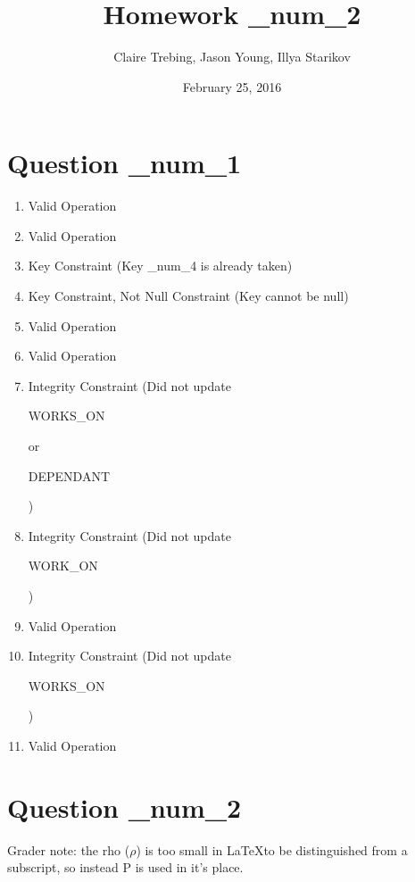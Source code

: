 \documentclass{article}
\title{Homework \_num_2}
\author{Claire Trebing, Jason Young, Illya Starikov}
\date{February 25, 2016}
\newcommand{\Rho}{\mathrm{P}}
\begin{document}
\maketitle

\section*{Question \_num_1}
\begin{enumerate}[label=\alph*.]
    \item Valid Operation
    \item Valid Operation
    \item Key Constraint (Key \_num_4 is already taken)
    \item Key Constraint, Not Null Constraint (Key cannot be null)
    \item Valid Operation
    \item Valid Operation
    \item Integrity Constraint (Did not update \begin{verb} WORKS_ON \end{verb} or \begin{verb} DEPENDANT \end{verb})
    \item Integrity Constraint (Did not update
    \begin{verb} WORK_ON \end{verb})
    \item Valid Operation
    \item Integrity Constraint (Did not update \begin{verb} WORKS_ON \end{verb})
    \item Valid Operation
\end{enumerate}

\section*{Question \_num_2}
Grader note: the rho ($\rho$) is too small in \LaTeX to be distinguished from a subscript, so instead $\Rho$ is used in it's place.
\end{document}
